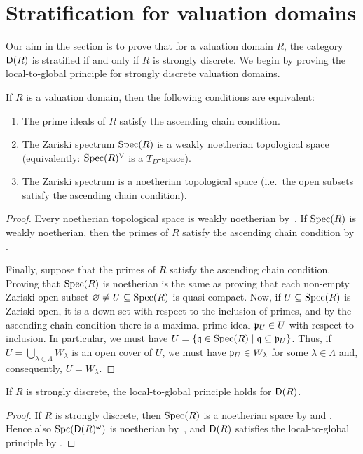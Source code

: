 \documentclass[reqno,a4paper]{amsart}
\begin{document}
\section{Stratification for valuation domains}

Our aim in the section is to prove that for a valuation domain $R$, the category $\mathsf{D}(R)$ is stratified if and only if $R$ is strongly discrete.
We begin by proving the local-to-global principle for strongly discrete valuation domains.

\begin{lemma} \label{lem:T_D-for-VD}
If $R$ is a valuation domain, then the following conditions are equivalent:
\begin{enumerate}
\item The prime ideals of $R$ satisfy the ascending chain condition.
\item The Zariski spectrum $\operatorname{Spec}(R)$ is a weakly noetherian topological space (equivalently: $\operatorname{Spec}(R)^\vee$ is a $T_D$-space).
\item The Zariski spectrum is a noetherian topological space (i.e.\ the open subsets satisfy the ascending chain condition).
\end{enumerate}
\end{lemma}
\begin{proof}
Every noetherian topological space is weakly noetherian by~\cite[Remark~2.2]{bhs23}.
If $\operatorname{Spec}(R)$ is weakly noetherian, then the primes of $R$ satisfy the ascending chain condition by \cite[Proposition~4.13]{cosupport}.

Finally, suppose that the primes of $R$ satisfy the ascending chain condition.
Proving that $\operatorname{Spec}(R)$ is noetherian is the same as proving that each non-empty Zariski open subset $\varnothing\ne U\subseteq\operatorname{Spec}(R)$ is quasi-compact.
Now, if $U\subseteq\operatorname{Spec}(R)$ is Zariski open, it is a down-set with respect to the inclusion of primes, and by the ascending chain condition there is a maximal prime ideal $\mathfrak{p}_U\in U$ with respect to inclusion.
In particular, we must have $U=\{\mathfrak{q}\in\operatorname{Spec}(R) \mid \mathfrak{q}\subseteq\mathfrak{p}_U\}$.
Thus, if $U=\bigcup_{\lambda\in\Lambda} W_\lambda$ is an open cover of $U$, we must have $\mathfrak{p}_U\in W_\lambda$ for some $\lambda\in\Lambda$ and, consequently, $U=W_\lambda$.
\end{proof}

\begin{lemma}\label{prop:l2gForStrongDiscrete}
If $R$ is strongly discrete, the local-to-global principle holds for $\mathsf{D}(R)$.
\end{lemma}
\begin{proof}
If $R$ is strongly discrete, then $\operatorname{Spec}(R)$ is a noetherian space by  and .
Hence also $\operatorname{Spc}(\mathsf{D}(R)^\omega)$ is noetherian by~, and $\mathsf{D}(R)$ satisfies the local-to-global principle by \cite[Theorem 6.9]{tensoractions}.
\end{proof}
\end{document}

